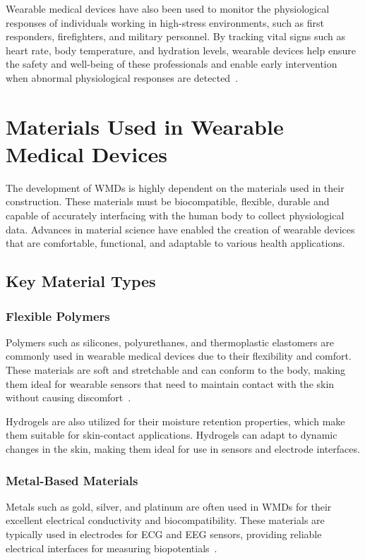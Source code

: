 \documentclass[journal]{IEEEtran}
\begin{document}
    Wearable medical devices have also been used to monitor the physiological responses of individuals working in high-stress environments, such as first responders, firefighters, and military personnel. By tracking vital signs such as heart rate, body temperature, and hydration levels, wearable devices help ensure the safety and well-being of these professionals and enable early intervention when abnormal physiological responses are detected~\cite{Lu2020}.

\section{Materials Used in Wearable Medical Devices}
\label{6.Materials}
The development of WMDs is highly dependent on the materials used in their construction. These materials must be biocompatible, flexible, durable and capable of accurately interfacing with the human body to collect physiological data. Advances in material science have enabled the creation of wearable devices that are comfortable, functional, and adaptable to various health applications.

    \subsection{Key Material Types}

        \subsubsection{Flexible Polymers}

        Polymers such as silicones, polyurethanes, and thermoplastic elastomers are commonly used in wearable medical devices due to their flexibility and comfort. These materials are soft and stretchable and can conform to the body, making them ideal for wearable sensors that need to maintain contact with the skin without causing discomfort~\cite{Trovato2022}.

        Hydrogels are also utilized for their moisture retention properties, which make them suitable for skin-contact applications. Hydrogels can adapt to dynamic changes in the skin, making them ideal for use in sensors and electrode interfaces.

        \subsubsection{Metal-Based Materials}

        Metals such as gold, silver, and platinum are often used in WMDs for their excellent electrical conductivity and biocompatibility. These materials are typically used in electrodes for ECG and EEG sensors, providing reliable electrical interfaces for measuring biopotentials~\cite{Kim2017}.
\end{document}
